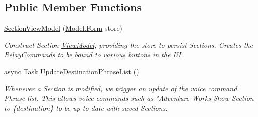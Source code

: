 \subsection*{Public Member Functions}
\begin{DoxyCompactItemize}
\item 
\hyperlink{class_listen_to_me_1_1_view_model_1_1_section_view_model_a622922d8160810c017cbe323966da8cd}{Section\+View\+Model} (\hyperlink{class_listen_to_me_1_1_model_1_1_form}{Model.\+Form} store)
\begin{DoxyCompactList}\small\item\em Construct Section \hyperlink{namespace_listen_to_me_1_1_view_model}{View\+Model}, providing the store to persist Sections. Creates the Relay\+Commands to be bound to various buttons in the UI. \end{DoxyCompactList}\item 
async Task \hyperlink{class_listen_to_me_1_1_view_model_1_1_section_view_model_a47ce8676fc601da4752a2ddab8d2250a}{Update\+Destination\+Phrase\+List} ()
\begin{DoxyCompactList}\small\item\em Whenever a Section is modified, we trigger an update of the voice command Phrase list. This allows voice commands such as "Adventure Works Show Section to \{destination\} to be up to date with saved Sections. \end{DoxyCompactList}\end{DoxyCompactItemize}
